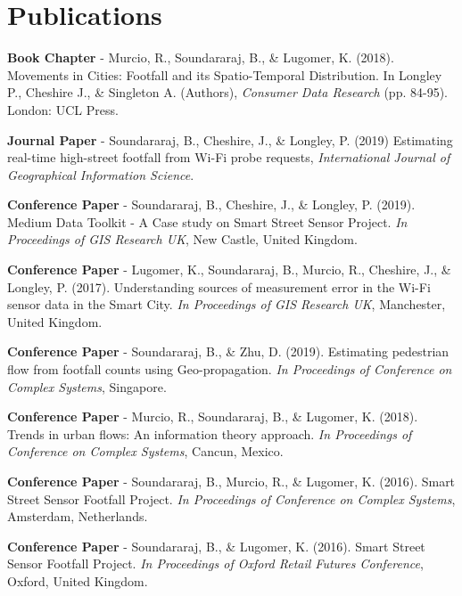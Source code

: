 \section*{Publications}
\textbf{Book Chapter} - Murcio, R., Soundararaj, B., \& Lugomer, K. (2018). Movements in Cities: Footfall and its Spatio-Temporal Distribution. In Longley P., Cheshire J., \& Singleton A. (Authors), \textit{Consumer Data Research} (pp. 84-95). London: UCL Press.
\vspace{0.2cm} \par \noindent \textbf{Journal Paper} - Soundararaj, B., Cheshire, J., \& Longley, P. (2019) Estimating real-time high-street footfall from Wi-Fi probe requests, \textit{International Journal of Geographical Information Science}.
\vspace{0.2cm} \par \noindent \textbf{Conference Paper} - Soundararaj, B., Cheshire, J., \& Longley, P. (2019). Medium Data Toolkit - A Case study on Smart Street Sensor Project. \textit{In Proceedings of GIS Research UK}, New Castle, United Kingdom.
\vspace{0.2cm} \par \noindent \textbf{Conference Paper} - Lugomer, K., Soundararaj, B., Murcio, R., Cheshire, J., \& Longley, P. (2017). Understanding sources of measurement error in the Wi-Fi sensor data in the Smart City. \textit{In Proceedings of GIS Research UK}, Manchester, United Kingdom.
\vspace{0.2cm} \par \noindent \textbf{Conference Paper} - Soundararaj, B., \& Zhu, D. (2019). Estimating pedestrian flow from footfall counts using Geo-propagation. \textit{In Proceedings of Conference on Complex Systems}, Singapore.
\vspace{0.2cm} \par \noindent \textbf{Conference Paper} - Murcio, R., Soundararaj, B., \& Lugomer, K. (2018). Trends in urban flows: An information theory approach. \textit{In Proceedings of Conference on Complex Systems}, Cancun, Mexico.
\vspace{0.2cm} \par \noindent \textbf{Conference Paper} - Soundararaj, B., Murcio, R., \& Lugomer, K. (2016). Smart Street Sensor Footfall Project. \textit{In Proceedings of Conference on Complex Systems}, Amsterdam, Netherlands.
\vspace{0.2cm} \par \noindent \textbf{Conference Paper} - Soundararaj, B., \& Lugomer, K. (2016). Smart Street Sensor Footfall Project. \textit{In Proceedings of Oxford Retail Futures Conference}, Oxford, United Kingdom.

